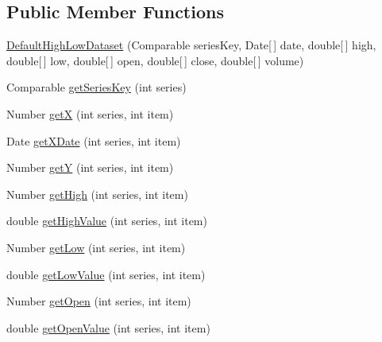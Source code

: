 \subsection*{Public Member Functions}
\begin{DoxyCompactItemize}
\item 
\mbox{\hyperlink{classorg_1_1jfree_1_1data_1_1xy_1_1_default_high_low_dataset_a6a70f2cdae232b8390f03ab22fc181c4}{Default\+High\+Low\+Dataset}} (Comparable series\+Key, Date\mbox{[}$\,$\mbox{]} date, double\mbox{[}$\,$\mbox{]} high, double\mbox{[}$\,$\mbox{]} low, double\mbox{[}$\,$\mbox{]} open, double\mbox{[}$\,$\mbox{]} close, double\mbox{[}$\,$\mbox{]} volume)
\item 
Comparable \mbox{\hyperlink{classorg_1_1jfree_1_1data_1_1xy_1_1_default_high_low_dataset_add9d58ed9313fdc2df68c80685aa5175}{get\+Series\+Key}} (int series)
\item 
Number \mbox{\hyperlink{classorg_1_1jfree_1_1data_1_1xy_1_1_default_high_low_dataset_aa55b6574aaf34207a1a53e6bd8e422ea}{getX}} (int series, int item)
\item 
Date \mbox{\hyperlink{classorg_1_1jfree_1_1data_1_1xy_1_1_default_high_low_dataset_a143f51146939e03ed291bd0c6a9fa371}{get\+X\+Date}} (int series, int item)
\item 
Number \mbox{\hyperlink{classorg_1_1jfree_1_1data_1_1xy_1_1_default_high_low_dataset_a0a62365f2ccccaf19cd49e003daeb5bc}{getY}} (int series, int item)
\item 
Number \mbox{\hyperlink{classorg_1_1jfree_1_1data_1_1xy_1_1_default_high_low_dataset_a3a49c92b4564fa5d6c9628b4395feaef}{get\+High}} (int series, int item)
\item 
double \mbox{\hyperlink{classorg_1_1jfree_1_1data_1_1xy_1_1_default_high_low_dataset_a00f2b176d8247829325f711fca2af339}{get\+High\+Value}} (int series, int item)
\item 
Number \mbox{\hyperlink{classorg_1_1jfree_1_1data_1_1xy_1_1_default_high_low_dataset_a01dec545835846178a9731df03bbc435}{get\+Low}} (int series, int item)
\item 
double \mbox{\hyperlink{classorg_1_1jfree_1_1data_1_1xy_1_1_default_high_low_dataset_a4cecc7ed3e3050d94f84389b3d82b9cb}{get\+Low\+Value}} (int series, int item)
\item 
Number \mbox{\hyperlink{classorg_1_1jfree_1_1data_1_1xy_1_1_default_high_low_dataset_a8fd97df563c199b6ace3bb56ac18b0a1}{get\+Open}} (int series, int item)
\item 
double \mbox{\hyperlink{classorg_1_1jfree_1_1data_1_1xy_1_1_default_high_low_dataset_abff3ec5a5c09adb6bf28255be06e3fab}{get\+Open\+Value}} (int series, int item)

\end{DoxyCompactItemize}
